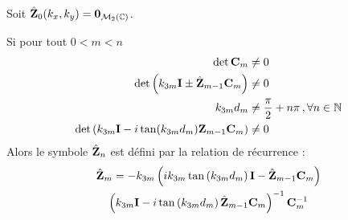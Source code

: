         \begin{thm}
            Soit $\hat {\mathbf{Z}}_0(k_x,k_y) = \mathbf{0}_{\mathcal{M}_2(\mathbb C)}$.

            Si pour tout $0<m < n$
            \begin{align}
                \det{\mathbf{C}_m} &\not = 0 \\
                \det\left(k_{3m}\mathbf{I} \pm \hat {\mathbf{Z}}_{m-1}\mathbf{C}_m \right) &\not = 0 \\
                k_{3m}d_m &\not = \dfrac{\pi}{2}+n\pi\,, \forall n \in \mathbb N \\
                \det\left(k_{3m}\mathbf{I} - i\tan(k_{3m}d_m)\mathbf{Z}_{m-1}\mathbf{C}_m\right) &\not = 0
            \end{align}
            Alors le symbole $\hat {\mathbf{Z}}_n$ est défini par la relation de récurrence : 
            \begin{multline}
            \hat {\mathbf{Z}}_m = -k_{3m}
            \left(ik_{3m}\tan\left(k_{3m}d_m\right)\mathbf{I} - \hat {\mathbf{Z}}_{m-1}\mathbf{C}_m\right) \\
            \left(k_{3m}\mathbf{I} - i\tan\left(k_{3m}d_m\right)\hat {\mathbf{Z}}_{m-1}\mathbf{C}_m\right)^{-1}
            \mathbf{C}_m^{-1}
            \end{multline}
        \end{thm}

